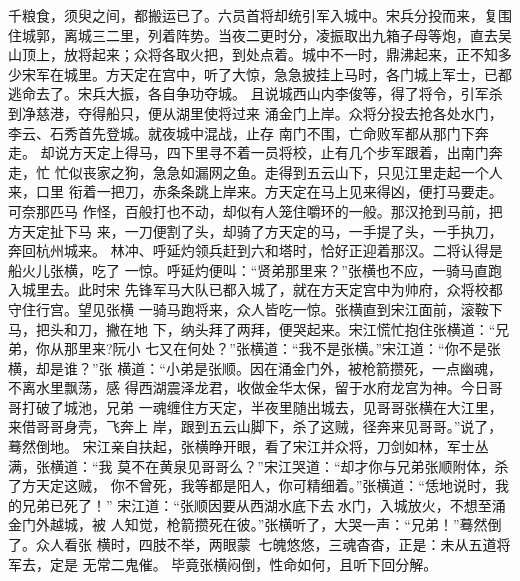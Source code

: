千粮食，须臾之间，都搬运已了。六员首将却统引军入城中。宋兵分投而来，复围
住城郭，离城三二里，列着阵势。当夜二更时分，凌振取出九箱子母等炮，直去吴
山顶上，放将起来；众将各取火把，到处点着。城中不一时，鼎沸起来，正不知多
少宋军在城里。方天定在宫中，听了大惊，急急披挂上马时，各门城上军士，已都
逃命去了。宋兵大振，各自争功夺城。
且说城西山内李俊等，得了将令，引军杀到净慈港，夺得船只，便从湖里使将过来
涌金门上岸。众将分投去抢各处水门，李云、石秀首先登城。就夜城中混战，止存
南门不围，亡命败军都从那门下奔走。
却说方天定上得马，四下里寻不着一员将校，止有几个步军跟着，出南门奔走，忙
忙似丧家之狗，急急如漏网之鱼。走得到五云山下，只见江里走起一个人来，口里
衔着一把刀，赤条条跳上岸来。方天定在马上见来得凶，便打马要走。可奈那匹马
作怪，百般打也不动，却似有人笼住嚼环的一般。那汉抢到马前，把方天定扯下马
来，一刀便割了头，却骑了方天定的马，一手提了头，一手执刀，奔回杭州城来。
林冲、呼延灼领兵赶到六和塔时，恰好正迎着那汉。二将认得是船火儿张横，吃了
一惊。呼延灼便叫：“贤弟那里来？”张横也不应，一骑马直跑入城里去。此时宋
先锋军马大队已都入城了，就在方天定宫中为帅府，众将校都守住行宫。望见张横
一骑马跑将来，众人皆吃一惊。张横直到宋江面前，滚鞍下马，把头和刀，撇在地
下，纳头拜了两拜，便哭起来。宋江慌忙抱住张横道：“兄弟，你从那里来?阮小
七又在何处？”张横道：“我不是张横。”宋江道：“你不是张横，却是谁？”张
横道：“小弟是张顺。因在涌金门外，被枪箭攒死，一点幽魂，不离水里飘荡，感
得西湖震泽龙君，收做金华太保，留于水府龙宫为神。今日哥哥打破了城池，兄弟
一魂缠住方天定，半夜里随出城去，见哥哥张横在大江里，来借哥哥身壳，飞奔上
岸，跟到五云山脚下，杀了这贼，径奔来见哥哥。”说了，蓦然倒地。
宋江亲自扶起，张横睁开眼，看了宋江并众将，刀剑如林，军士丛满，张横道：“我
莫不在黄泉见哥哥么？”宋江哭道：“却才你与兄弟张顺附体，杀了方天定这贼，
你不曾死，我等都是阳人，你可精细着。”张横道：“恁地说时，我的兄弟已死了！”
宋江道：“张顺因要从西湖水底下去水门，入城放火，不想至涌金门外越城，被
人知觉，枪箭攒死在彼。”张横听了，大哭一声：“兄弟！”蓦然倒了。众人看张
横时，四肢不举，两眼蒙，七魄悠悠，三魂杳杳，正是：未从五道将军去，定是
无常二鬼催。
毕竟张横闷倒，性命如何，且听下回分解。